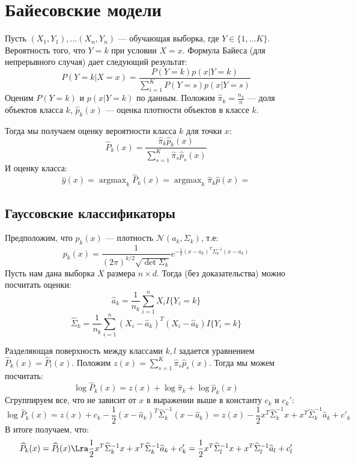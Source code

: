 
\section{Байесовские модели}
Пусть \((X_1, Y_1), \dots (X_n, Y_n)\) --- обучающая выборка, где \(Y \in \{1, \dots K\}\). Вероятность того, что \(Y = k\) при условии \(X = x\). Формула Байеса (для непрерывного случая) дает следующий результат:
\[P(Y = k | X = x) = \frac{P(Y = k)p(x|Y = k)}{\sum_{i = 1}^K P(Y = s)p(x|Y = s)}\]
Оценим \(P(Y = k)\) и \(p(x|Y = k)\) по данным. Положим \(\widehat{\pi}_k = \frac{n_k}{n}\) --- доля объектов класса \(k\), \(\widehat{p}_k(x)\) --- оценка плотности объектов в классе \(k\). 

Тогда мы получаем оценку вероятности класса \(k\) для точки \(x\):
\[\widehat{P}_k(x) = \frac{\widehat{\pi}_k\widehat{p}_k(x)}{\sum_{s = 1}^K \widehat{\pi}_s\widehat{p}_s(x)}\]
И оценку класса:
\[\widehat{y}(x) = \operatorname{argmax}_k \widehat{P}_k(x) = \operatorname{argmax}_k \widehat{\pi}_k\widehat{p}(x) = \]

\subsection{Гауссовские классификаторы}
Предположим, что \(p_k(x)\) --- плотность \(\mathcal{N}(a_k, \Sigma_k)\), т.е:
\[p_k(x) = \frac{1}{(2\pi)^{k/2}\sqrt{\det \Sigma_k}}e^{-\frac{1}{2}(x - a_k)^T\Sigma_k^{-1}(x - a_k)}\]
Пусть нам дана выборка \(X\) размера \(n \times d\). Тогда (без доказательства) можно посчитать оценки:
\[\widehat{a}_k = \frac{1}{n_k}\sum_{i = 1}^n X_iI\{Y_i = k\}\]
\[\widehat{\Sigma}_k = \frac{1}{n_k}\sum_{i = 1}^n (X_i - \widehat{a}_k)^T(X_i - \widehat{a}_k)I\{Y_i = k\}\]

Разделяющая поверхность между классами \(k, l\) задается уравнением \(\widehat{P}_k(x) = \widehat{P}_l(x)\). Положим \(z(x) = \sum_{s = 1}^K \widehat{\pi}_s\widehat{p}_s(x)\). Тогда мы можем посчитать:
\[\log \widehat{P}_k(x) = z(x) + \log\widehat{\pi}_k +  \log\widehat{p}_k(x)\]
Сгруппируем все, что не зависит от \(x\) в выражении выше в константу \(c_k\) и \(c_k'\):
\[\log \widehat{P}_k(x) = z(x) + c_k - \frac{1}{2}(x - \widehat{a}_k)^T\widehat{\Sigma}_k^{-1}(x - \widehat{a}_k) = z(x) - \frac{1}{2}x^T\widehat{\Sigma}_k^{-1}x + x^T\widehat{\Sigma}_k^{-1}\widehat{a}_k + c'_k\]
В итоге получаем, что:
\[\widehat{P}_k(x) = \widehat{P}_l(x) \Lra \frac{1}{2}x^T\widehat{\Sigma}_k^{-1}x + x^T\widehat{\Sigma}_k^{-1}\widehat{a}_k + c'_k = \frac{1}{2}x^T\widehat{\Sigma}_l^{-1}x + x^T\widehat{\Sigma}_l^{-1}\widehat{a}_l + c'_l\]

